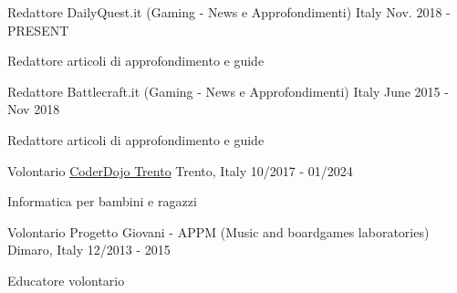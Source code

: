 

\begin{cventries}

  \cventry
    {Redattore} %
    {DailyQuest.it (Gaming - News e Approfondimenti)} %
    {Italy} %
    {Nov. 2018 - PRESENT} %
    {
      \begin{cvitems} %
        \item {Redattore articoli di approfondimento e guide}
      \end{cvitems}
    }

  \cventry
    {Redattore} %
    {Battlecraft.it (Gaming - News e Approfondimenti)} %
    {Italy} %
    {June 2015 - Nov 2018} %
    {
      \begin{cvitems} %
        \item {Redattore articoli di approfondimento e guide}
      \end{cvitems}
    }

  \cventry
    {Volontario} %
    {\href{https://www.coderdojotrento.it/}{CoderDojo Trento}} %
    {Trento, Italy} %
    {10/2017 - 01/2024} %
    {
      \begin{cvitems} %
        \item {Informatica per bambini e ragazzi}
      \end{cvitems}
    }

  \cventry
    {Volontario} %
    {Progetto Giovani - APPM (Music and boardgames laboratories)} %
    {Dimaro, Italy} %
    {12/2013 - 2015} %
    {
      \begin{cvitems} %
        \item {Educatore volontario}
      \end{cvitems}
    }

\end{cventries}
